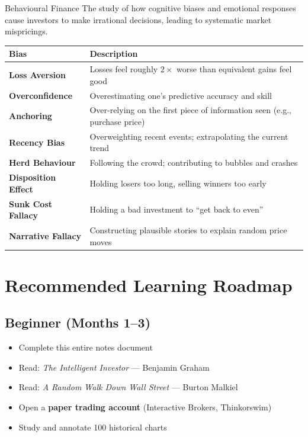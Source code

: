 \begin{keyterm}{Behavioural Finance}
The study of how cognitive biases and emotional responses cause investors to make
irrational decisions, leading to systematic market mispricings.
\end{keyterm}

\begin{center}
\begin{tabular}{>{\bfseries}p{4cm} p{9cm}}
\toprule
Bias & Description \\
\midrule
Loss Aversion & Losses feel roughly $2\times$ worse than equivalent gains feel good \\
Overconfidence & Overestimating one's predictive accuracy and skill \\
Anchoring & Over-relying on the first piece of information seen (e.g., purchase price) \\
Recency Bias & Overweighting recent events; extrapolating the current trend \\
Herd Behaviour & Following the crowd; contributing to bubbles and crashes \\
Disposition Effect & Holding losers too long, selling winners too early \\
Sunk Cost Fallacy & Holding a bad investment to ``get back to even'' \\
Narrative Fallacy & Constructing plausible stories to explain random price moves \\
\bottomrule
\end{tabular}
\end{center}

\section{Recommended Learning Roadmap}

\subsection{Beginner (Months 1--3)}
\begin{itemize}[noitemsep]
  \item Complete this entire notes document
  \item Read: \textit{The Intelligent Investor} — Benjamin Graham
  \item Read: \textit{A Random Walk Down Wall Street} — Burton Malkiel
  \item Open a \textbf{paper trading account} (Interactive Brokers, Thinkorswim)
  \item Study and annotate 100 historical charts
\end{itemize}

